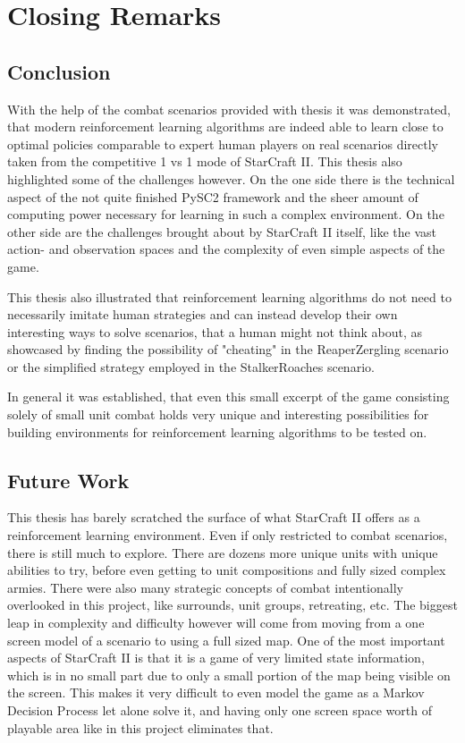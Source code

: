 
\chapter{Closing Remarks} %

\label{chap_closing} %

\section{Conclusion}
With the help of the combat scenarios provided with thesis it was demonstrated, that modern reinforcement learning algorithms are indeed able to learn close to optimal policies comparable to expert human players on real scenarios directly taken from the competitive 1 vs 1 mode of StarCraft II. This thesis also highlighted some of the challenges however. On the one side there is the technical aspect of the not quite finished PySC2 framework and the sheer amount of computing power necessary for learning in such a complex environment. On the other side are the challenges brought about by StarCraft II itself, like the vast action- and observation spaces and the complexity of even simple aspects of the game.

This thesis also illustrated that reinforcement learning algorithms do not need to necessarily imitate human strategies and can instead develop their own interesting ways to solve scenarios, that a human might not think about, as showcased by finding the possibility of "cheating" in the ReaperZergling scenario or the simplified strategy employed in the StalkerRoaches scenario.

In general it was established, that even this small excerpt of the game consisting solely of small unit combat holds very unique and interesting possibilities for building environments for reinforcement learning algorithms to be tested on. 

\section{Future Work}
This thesis has barely scratched the surface of what StarCraft II offers as a reinforcement learning environment. Even if only restricted to combat scenarios, there is still much to explore. There are dozens more unique units with unique abilities to try, before even getting to unit compositions and fully sized complex armies. There were also many strategic concepts of combat intentionally overlooked in this project, like surrounds, unit groups, retreating, etc. The biggest leap in complexity and difficulty however will come from moving from a one screen model of a scenario to using a full sized map. One of the most important aspects of StarCraft II is that it is a game of very limited state information, which is in no small part due to only a small portion of the map being visible on the screen. This makes it very difficult to even model the game as a Markov Decision Process let alone solve it, and having only one screen space worth of playable area like in this project eliminates that.

